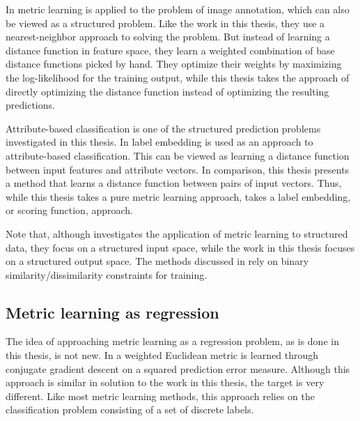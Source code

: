 In \cite{guillaumin2009tagprop} metric learning is applied to the problem of image annotation, which can also be viewed as a structured problem. Like the work in this thesis, they use a nearest-neighbor approach to solving the problem. But instead of learning a distance function in feature space, they learn a weighted combination of base distance functions picked by hand. They optimize their weights by maximizing the log-likelihood for the training output, while this thesis takes the approach of directly optimizing the distance function instead of optimizing the resulting predictions.

Attribute-based classification is one of the structured prediction problems investigated in this thesis. In \cite{akata2013label} label embedding is used as an approach to attribute-based classification. This can be viewed as learning a distance function between input features and attribute vectors. In comparison, this thesis presents a method that learns a distance function between pairs of input vectors. Thus, while this thesis takes a pure metric learning approach, \cite{akata2013label} takes a label embedding, or scoring function, approach.

Note that, although \cite{bellet2013survey} investigates the application of metric learning to structured data, they focus on a structured input space, while the work in this thesis focuses on a structured output space. The methods discussed in \cite{bellet2013survey} rely on binary similarity/dissimilarity constraints for training.


\subsection{Metric learning as regression}

The idea of approaching metric learning as a regression problem, as is done in this thesis, is not new. In \cite{lowe1995similarity} a weighted Euclidean metric is learned through conjugate gradient descent on a squared prediction error measure. Although this approach is similar in solution to the work in this thesis, the target is very different. Like most metric learning methods, this approach relies on the classification problem consisting of a set of discrete labels.

